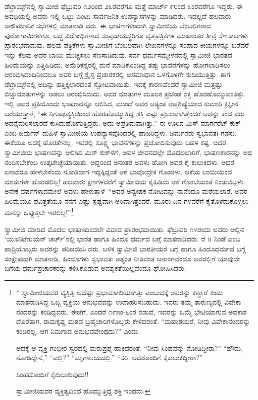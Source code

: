 ಡೆಟ್ರಾಯ್ಟ್​ನಲ್ಲಿ ಸ್ವಾಮೀಜಿ ಫೆಬ್ರುವರಿ ೧೨ರಿಂದ ೨೩ರವರೆಗೂ ಮತ್ತೆ ಮಾರ್ಚ್ ೯ರಿಂದ ೩ಂರವರೆಗೂ ಇದ್ದರು. ಈ ಅವಧಿಯಲ್ಲಿ ಅವರು ಇಲ್ಲಿ ಒಟ್ಟು ಎಂಟು ಸಾರ್ವಜನಿಕ ಉಪನ್ಯಾಸಗಳನ್ನು ಮಾಡಿದರು. ಇದಲ್ಲದೆ ಹಲವಾರು ಅನೌಪಚಾರಿಕ ಸಭೆಗಳಲ್ಲಿ ಮಾತನಾಡಿ ದರು. ಈ ಭಾಷಣಗಳಿಂದಾಗಿ ಸ್ವಾಮೀಜಿಯ ಬೆಂಬಲಿಗರಾದ ಪುರೋಗಾಮಿಗಳಿಗೂ, ಬದ್ಧ ವಿರೋಧಿಗಳಾದ ಸಂಪ್ರದಾಯಸ್ಥರಿಗೂ ವೃತ್ತಪತ್ರಿಕೆಗಳ ಮುಖಾಂತರ ತೀವ್ರ ಸೆಣಸಾಟಗಳು ಪ್ರಾರಂಭವಾದುವು. ಹಲವು ಪತ್ರಿಕೆಗಳು ಸ್ವಾಮೀಜಿಗೆ ಬೆಂಬಲವಾಗಿ ಲೇಖನಗಳನ್ನೂ ಸಂಪಾದ ಕೀಯಗಳನ್ನೂ ಬರೆದರೆ ಇನ್ನು ಕೆಲವು ಅವರ ಬಾಯಿ ಮುಚ್ಚಿಸಲು ಸೆಣಸಾಡಿದುವು. ಸರ್ವ ಧರ್ಮಸಮ್ಮೇಳನದಲ್ಲಿ ಸ್ವಾಮೀಜಿ ಭಾರತದ ಹಿರಿಮೆಯನ್ನು ಎತ್ತಿಹಿಡಿದು, ಅಮೆರಿಕನ್ನರಲ್ಲಿ ಮನೆ ಮಾಡಿಕೊಂಡಿದ್ದ ತಪ್ಪು ಭಾವನೆಗಳನ್ನು ಹೋಗಲಾಡಿಸಲು ಆರಂಭಿಸಿದಂದಿನಿಂದಲೂ ಅವರ ಬಗ್ಗೆ ಕ್ರೈಸ್ತ ಪ್ರಚಾರಕರಲ್ಲಿ ಅಸಮಾಧಾನ ಒಳಗೊಳಗೇ ಕುದಿಯುತ್ತಿತ್ತು. ಈಗ ಡೆಟ್ರಾಯ್ಟ್​ನಲ್ಲಿ ಅದಿನ್ನು ಹತ್ತಿಕ್ಕಲಾರದಂತೆ ಸ್ಫೋಟವಾಯಿತು. ಇದಕ್ಕೆ ಕಾರಣವೆಂದರೆ ಸ್ವಾಮೀಜಿ ಮತ್ತಷ್ಟು ಬಿಚ್ಚುಮಾತುಗಳನ್ನು ಆಡಲು ಆರಂಭಿಸಿದುದು. ಅವರ ಮಾತುಗಳ ಮೂಲಕ ಪ್ರಚಂಡ ಶಕ್ತಿ ಹೊರಹೊಮ್ಮುವಂತಿತ್ತು. ಇಲ್ಲಿ ಅವರ ಪ್ರತಿಯೊಂದು ಭಾಷಣವನ್ನೂ ಆಲಿಸಿದ, ಮುಂದೆ ಅವರ ಅತ್ಯಂತ ಆಪ್ತಶಿಷ್ಯೆಯಾದ ಕುಮಾರಿ ಕ್ರಿಸ್ಟೀನ ಬರೆಯುತ್ತಾಳೆ, “ಈ ನಿಗೂಢವ್ಯಕ್ತಿಯಿಂದ ಹೊರಹೊಮ್ಮುತ್ತಿದ್ದ ಶಕ್ತಿ ಎಷ್ಟು ಪ್ರಬಲವಾಗಿತ್ತೆಂದರೆ ಅದನ್ನು ಕಂಡ ವರು ಅದನ್ನೆದುರಿಸಲಾರದೆ ಕುಸಿದುಹೋಗುತ್ತಿದ್ದರು. ಅದು ಅಪ್ರತಿಮವಾಗಿತ್ತು.” ಈ ಊರಿನ ಮಿಸ್ ಮಾರ್ಗರೆಟ್ ಕುಕ್ ಎಂಬ ಜರ್ಮನ್ ಮಹಿಳೆ ಸ್ವಾಮೀಜಿಯ ಉಪನ್ಯಾಸವೊಂದರಲ್ಲಿ ಹಾಜರಿದ್ದಳು. ಜರ್ಮನರು ಸ್ವಭಾವತಃ ಗಡಸು. ಈಕೆಯೂ ಅದಕ್ಕೆ ಹೊರತೇನಲ್ಲ. ಇವರಲ್ಲಿ ಸೂಕ್ಷ್ಮ ಭಾವನೆಗಳನ್ನು ಪ್ರಚೋದಿಸುವುದು ಬಹಳ ಕಷ್ಟ. ಆದರೆ ಸ್ವಾಮೀಜಿಯ ಭಾಷಣವನ್ನು ಆಲಿಸಿದ ಮಿಸ್ ಕುಕ್​ಳಿಗೆ, ಅವಳ ಜೀವನದಲ್ಲೇ ಮೊದಲಬಾರಿಗೆ, ಭಾಷಣಕಾರನನ್ನು ಅಭಿ ನಂದಿಸಬೇಕೆಂಬ ಉತ್ಕಟೇಚ್ಛೆಯಾಯಿತು. ಆದ್ದರಿಂದ ಅನಂತರ ಅವಳು ಹೋಗಿ ಅವರ ಕೈ ಕುಲುಕಿದಳು. ಆದರೆ ಏನಾದರೂ ಹೇಳಬೇಕೆಂದು ನೋಡಿದಾಗ ಇದ್ದಕ್ಕಿದ್ದಂತೆ ಆಕೆ ಭಾವೋದ್ರೇಕ ಗೊಂಡಳು. ಆಕೆಯ ಬಾಯಿಯಿಂದ ಮಾತುಗಳೇ ಹೊರಡಲಿಲ್ಲ! ಹಲವಾರು ಕ್ಷಣಗಳವರೆಗೆ ಸ್ವಾಮೀಜಿಯ ಕೈಹಿಡಿದು ಆಕೆ ಗೊಂಬೆಯಂತೆ ನಿಂತುಬಿಟ್ಟಳು. ಅನೇಕ ವರ್ಷಗಳಾದಮೇಲೆ ಅವಳು ಹೇಳುತ್ತಾಳೆ–“ಅವರ ಅನ್ವೇಷಕ ನೋಟವನ್ನು ನಾನೆಂದೂ ಮರೆಯಲಾರೆ. ಅವರ ಹಿರಿಮೆಯೂ ಪವಿತ್ರತೆಯೂ ನನಗೆ ಎಷ್ಟು ಸ್ಪಷ್ಟವಾಗಿ ಅರಿವಾಗಿತ್ತೆಂದರೆ, ಮೂರು ದಿನ ಗಳವರೆಗೆ ಕೈತೊಳೆದುಕೊಳ್ಳಲು ಮನಸ್ಸು ಒಪ್ಪುತ್ತಲೇ ಇರಲಿಲ್ಲ!”\footnote{* ಸ್ವಾಮೀಜಿಯವರ ವ್ಯಕ್ತಿತ್ವ ಅದೆಷ್ಟು ಪ್ರಭಾವಶಾಲಿಯಾಗಿತ್ತು ಎಂಬುದಕ್ಕೆ ಅವರನ್ನು ಕಣ್ಣಾರೆ ಕಂಡು ಮಾತನಾಡಿಸಿದ್ದ ಒಬ್ಬ ವ್ಯಕ್ತಿಯ ಅನುಭವವನ್ನು ಉದಾಹರಿಸಬಹುದು. ಇವರು ತಮ್ಮ ತಾರುಣ್ಯದಲ್ಲಿ ವಿವೇಕಾ ನಂದರನ್ನು ಕಂಡಿದ್ದವರು. ಈಚೆಗೆ, ಎಂದರೆ ೧೯೫ಂ-೬ಂರ ನಡುವೆ, ಇವರನ್ನು ಒಮ್ಮೆ ಭೇಟಿಯಾಗುವ ಅವಕಾಶ ದೊರೆತಾಗ, ರಾಮಕೃಷ್ಣ ಮಠದ ಬ್ರಹ್ಮಚಾರಿಗಳೊಬ್ಬರು ಕೇಳಿದರಂತೆ, “ಮಹಾಶಯರೆ, ನೀವು ವಿವೇಕಾನಂದರನ್ನು ಕಂಡಿರಲ್ಲ, ಆಗ ನಿಮಗಾದ ಅನುಭವವೇಂಥದು?” ಎಂದು.

ಅದಕ್ಕೆ ಆ ವ್ಯಕ್ತಿ ಗಂಭೀರ ಸ್ವರದಲ್ಲಿ ಮರುಪ್ರಶ್ನೆ ಹಾಕಿದರಂತೆ, “ನೀವು ಸಿಂಹವನ್ನು ನೋಡಿದ್ದೀರಾ?” “ಹೌದು, ನೋಡಿದ್ದೇನೆ,” “ಎಲ್ಲಿ?” “ಮೃಗಾಲಯದಲ್ಲಿ.” “ಸರಿ. ಅದರೊಂದಿಗೆ ಕೈಕುಲುಕಿದ್ದೀರಾ?”

ಸಿಂಹದೊಂದಿಗೆ ಕೈಕುಲುಕುವುದು!!

ಸ್ವಾಮೀಜಿಯವರ ವ್ಯಕ್ತಿತ್ವದಿಂದ ಹೊಮ್ಮುತ್ತಿದ್ದ ಶಕ್ತಿ ಇಂಥದು.}

ಸ್ವಾಮೀಜಿ ಮಾಡಿದ ಮೊದಲ ಭಾಷಣದಿಂದಲೇ ವಿವಾದ ಪ್ರಾರಂಭವಾಯಿತು. ಫೆಬ್ರುವರಿ ೧೪ರಂದು ಅವರು ಅಲ್ಲಿನ ‘ಯೂನಿಟೇರಿಯನ್ ಚರ್ಚ್​’ನಲ್ಲಿ ಭಾರತ ಹಾಗೂ ಹಿಂದೂ ಧರ್ಮದ ಬಗ್ಗೆ ಮಾತನಾಡಿದರು. ರೆ ॥ ನಿಂಡೆ ಎಂಬ ಪಾದ್ರಿಯೊಬ್ಬರು ಅವರನ್ನು ಪರಿಚಯಿಸಿ ದರು. ಬಳಿಕ ಸ್ವಾಮೀಜಿ ಭಾರತೀಯರ ಬಗ್ಗೆ ಹಾಗೂ ಹಿಂದೂಧರ್ಮದ ಬಗ್ಗೆ ಸಂಕ್ಷೇಪವಾಗಿ ಮಾತನಾಡಿ, ಹಿಂದೂಗಳು ಸ್ವಭಾವತಃ ಅತ್ಯಂತ ನೀತಿವಂತ ಜನಾಂಗವೆಂದೂ ಅವರಲ್ಲಿಗೆ ಯಾವುದೇ ಬಗೆಯ ಧರ್ಮಪ್ರಚಾರಕರನ್ನು ಕಳಿಸಿಕೊಡುವ ಅವಶ್ಯಕತೆಯಿಲ್ಲವೆಂದೂ ಘೋಷಿಸಿದರು.

